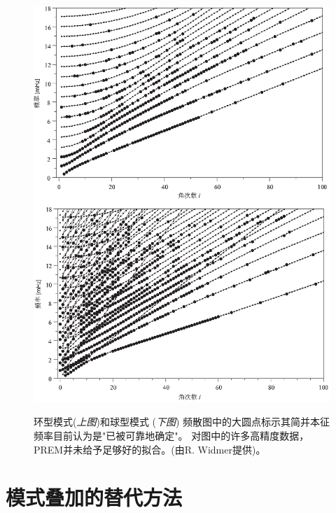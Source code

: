 \begin{figure}[!b]
\begin{center}
\scalebox{0.85}
{
\includegraphics{../figures/chap10/fig23.eps}
}
\end{center}
\caption[Guy modes]{
\label{fig:10.25}
环型模式({\em 上图\/})和球型模式 ({\em 下图\/}) 频散图中的大圆点标示其简并本征频率目前认为是"已被可靠地确定"。
对图中的许多高精度数据，PREM并未给予足够好的拟合。(由R. Widmer提供)。}
\end{figure}

\renewcommand{\thesection}{$\!\!\!\raise1.3ex\hbox{$\star$}\!\!$
\arabic{chapter}.\arabic{section}}
\section{模式叠加的替代方法}
\renewcommand{\thesection}{\arabic{chapter}.\arabic{section}}

